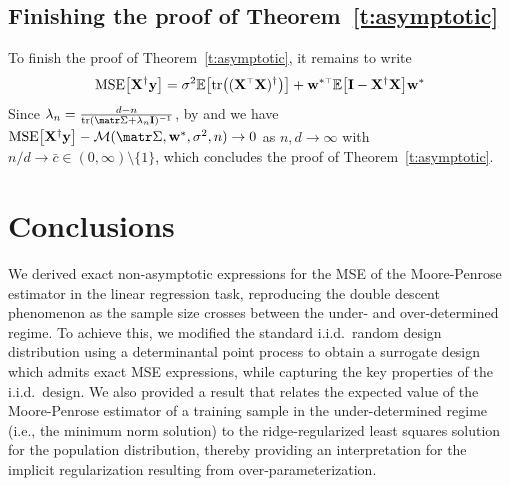 \documentclass[../../thesis.tex]{subfiles}
\begin{document}
\subsection{Finishing the proof of Theorem~\ref{t:asymptotic}}

To finish the proof of Theorem~\ref{t:asymptotic}, it remains to write
\[
  \MSE{\X^\dagger\y} = \sigma^2\E\big[\tr\big((\X^\top\X)^{\dagger}\big)\big] +
  \w^{*\top}\E\big[\I-\X^\dagger\X\big]\w^*
\]
Since $\lambda_n = \frac{d-n}{ \tr (\Sigmab + \lambda_n \I)^{-1} }$,
by  and  we have
$\MSE{\X^\dagger\y} - \Mc(\Sigmab, \w^*, \sigma^2, n) \to 0$ as $n,d
  \to \infty$ with $n/d \to \bar c \in (0,\infty) \setminus \{ 1 \}$,
which concludes the proof of Theorem~\ref{t:asymptotic}.





\section{Conclusions}
\label{s:conclusions}

We derived exact non-asymptotic expressions for the MSE of the
Moore-Penrose estimator in the linear regression task, reproducing
the double descent phenomenon as the sample size crosses between the
under- and over-determined regime. To achieve this, we modified the
standard i.i.d.~random design distribution using a determinantal
point process to obtain a surrogate design which admits exact MSE expressions,
while capturing the key properties of the i.i.d.~design. We
also provided a result that relates the expected value of the
Moore-Penrose estimator of a training sample in the under-determined regime (i.e., the
minimum norm solution) to the ridge-regularized least squares solution
for the population distribution, thereby providing an interpretation for the
implicit regularization resulting from over-parameterization.
\end{document}
